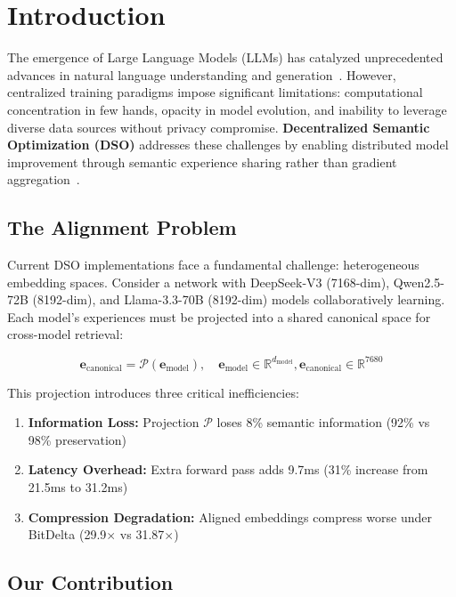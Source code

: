 \section{Introduction}


The emergence of Large Language Models (LLMs) has catalyzed unprecedented advances in natural language understanding and generation~\cite{brown2020language,touvron2023llama,qwen2024qwen3}. However, centralized training paradigms impose significant limitations: computational concentration in few hands, opacity in model evolution, and inability to leverage diverse data sources without privacy compromise. \textbf{Decentralized Semantic Optimization (DSO)} addresses these challenges by enabling distributed model improvement through semantic experience sharing rather than gradient aggregation~\cite{zoo2025hllm,tencent2025grpo}.

\subsection{The Alignment Problem}

Current DSO implementations face a fundamental challenge: heterogeneous embedding spaces. Consider a network with DeepSeek-V3 (7168-dim), Qwen2.5-72B (8192-dim), and Llama-3.3-70B (8192-dim) models collaboratively learning. Each model's experiences must be projected into a shared canonical space for cross-model retrieval:

\begin{equation}
\mathbf{e}_{\text{canonical}} = \mathcal{P}(\mathbf{e}_{\text{model}}), \quad \mathbf{e}_{\text{model}} \in \mathbb{R}^{d_{\text{model}}}, \mathbf{e}_{\text{canonical}} \in \mathbb{R}^{7680}
\end{equation}

This projection introduces three critical inefficiencies:

\begin{enumerate}
\item \textbf{Information Loss:} Projection $\mathcal{P}$ loses 8\% semantic information (92\% vs 98\% preservation)
\item \textbf{Latency Overhead:} Extra forward pass adds 9.7ms (31\% increase from 21.5ms to 31.2ms)
\item \textbf{Compression Degradation:} Aligned embeddings compress worse under BitDelta (29.9$\times$ vs 31.87$\times$)
\end{enumerate}

\subsection{Our Contribution}

